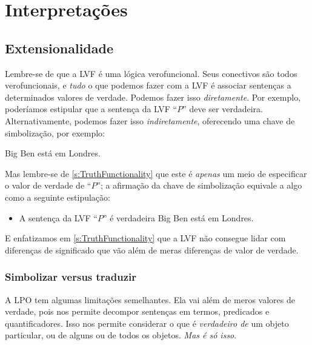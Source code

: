 \part{Interpretações}
\label{ch.semantics}


\chapter{Extensionalidade}\label{s:Interpretations}

Lembre-se de que a LVF é uma lógica verofuncional. Seus conectivos são todos verofuncionais, e \emph{tudo} o que podemos fazer com a LVF é associar sentenças a determinados valores de verdade. Podemos fazer isso \emph{diretamente}. Por exemplo, poderíamos estipular que a sentença da LVF \textquotedblleft $P$\textquotedblright{} deve ser verdadeira. Alternativamente, podemos fazer isso \emph{indiretamente}, oferecendo uma chave de simbolização, por exemplo:
	\begin{ekey}
\item[P] Big Ben está em Londres.
	\end{ekey}
Mas lembre-se de \cref{s:TruthFunctionality} que este é \emph{apenas} um meio de especificar o valor de verdade de \textquotedblleft $P$\textquotedblright{}; a afirmação da chave de simbolização equivale a algo como a seguinte estipulação:
	\begin{itemize}
\item A sentença da LVF \textquotedblleft $P$\textquotedblright{} é verdadeira \ifeff{} Big Ben está em Londres.
	\end{itemize}
E enfatizamos em \cref{s:TruthFunctionality} que a LVF não consegue lidar com diferenças de significado que vão além de meras diferenças de valor de verdade.

\section{Simbolizar versus traduzir}

A LPO tem algumas limitações semelhantes. Ela vai além de meros valores de verdade, pois nos permite decompor sentenças em termos, predicados e quantificadores. Isso nos permite considerar o que é \emph{verdadeiro de} um objeto particular, ou de alguns ou de todos os objetos. \emph{Mas é só isso}.




